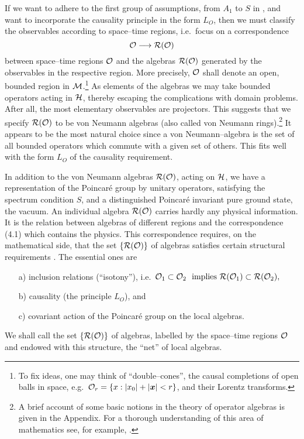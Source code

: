 If we want to adhere to the first group of assumptions, from $A_1$ to $S$
in \sectwo, and want to incorporate the causality principle in the
form $L_O$, then we must classify the observables according to
space--time regions, i.e.\ focus on a correspondence
\begin{equation}
\cal O \longrightarrow {\cal R}({\cal O})
\end{equation}
between space--time regions $\cal O$ and the algebras ${\cal R}({\cal O})$
generated by the observables in the respective region. 
More precisely,
${\cal O}$ shall denote an open, bounded region
in $\cal M$.\footnote{To fix ideas, one may think of ``double--cones'',
\label{dc} the causal completions of open balls in space,  
e.g.\ ${\cal O}_r = \{x : |x_0| + |\mbox{{\boldmath $x$}}| < r \}$, and their Lorentz
transforms.} As elements of
the algebras we may take bounded operators acting in $\cal{H}$,
thereby escaping the complications with domain problems. After all, the
most elementary observables are projectors. This suggests that we specify
${\cal R}({\cal O})$ to be von Neumann algebras 
(also called von Neumann rings).\footnote{A brief account 
\label{math} of some basic notions in the theory of operator algebras is given
in the Appendix. For a thorough understanding of
this area of mathematics see, for example, \cite{KaRi,BrRo}.} 
It appears to be
the most natural choice since a von Neumann--algebra is the set of all
bounded operators which commute with a given set of others. This fits
well with the form $L_O$ of the causality requirement. 

In addition to the von Neumann algebras ${\cal R}({\cal O})$, acting
on $\cal H$, we have a representation of the Poincar\'e group
by unitary operators, satisfying the spectrum condition $S$, and 
a distinguished Poincar\'e invariant pure ground state, the vacuum.
An indiv\-idual algebra ${\cal R}({\cal O})$ carries hardly any physical information.
It is the relation between algebras of different regions and the 
correspondence (4.1) which contains the physics. This correspondence
requires, on the mathematical side, that the set 
$\{ {\cal R}({\cal O}) \}$ of algebras 
satisfies certain structural requirements \cite{Ha}.
The essential ones are 
\begin{itemize}
  \item[a)] inclusion relations (``isotony''), i.e.\
$ {\cal O}_1 \subset {\cal O}_2 \ \mbox{ implies} \
{\cal R} ({\cal O}_1) \subset 
{\cal R} ({\cal O}_2), $
\item[b)] causality (the principle $L_O$), and
\item[c)] covariant action of the Poincar\'e group on the local
  algebras. 
\end{itemize}
We shall call the set  $\{ {\cal R}({\cal O}) \}$ of algebras, labelled by the 
space--time regions $\cal O$ and endowed with this structure, the
``net'' of local algebras. 

